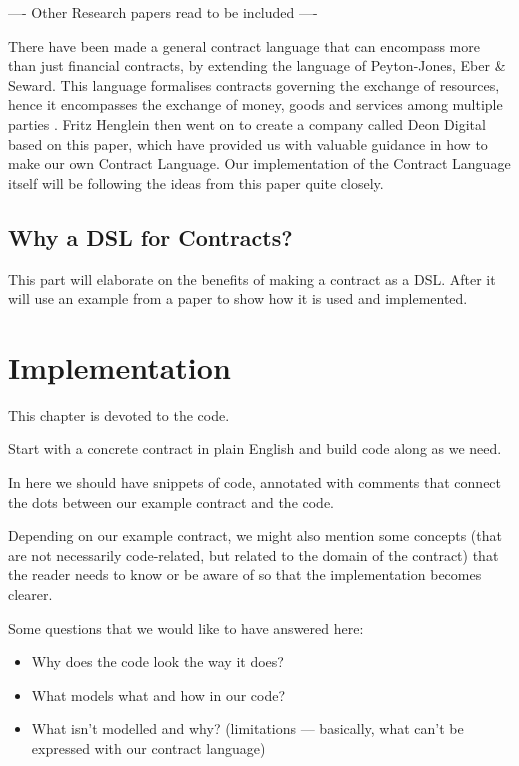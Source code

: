 \documentclass{ituthesis}
\begin{document}
---- Other Research papers read to be included ----

There have been made a general contract language that can encompass more than just financial contracts, by extending the language of Peyton-Jones, Eber \& Seward. This language formalises contracts governing the exchange of resources, hence it encompasses the exchange of money, goods and services among multiple parties \cite{andersen2006compositional}. Fritz Henglein then went on to create a company called Deon Digital based on this paper, which have provided us with valuable guidance in how to make our own Contract Language. Our implementation of the Contract Language itself will be following the ideas from this paper quite closely.

\section{Why a DSL for Contracts?}

This part will elaborate on the benefits of making a contract as a DSL. After it will use an example from a paper to show how it is used and implemented.


\chapter{Implementation}
This chapter is devoted to the code.\par
Start with a concrete contract in plain English and build code along as we need.\par
In here we should have snippets of code, annotated with comments that connect the dots between our example contract and the code.\par
Depending on our example contract, we might also mention some concepts (that are not necessarily code-related, but related to the domain of the contract) that the reader needs to know or be aware of so that the implementation becomes clearer.\par
Some questions that we would like to have answered here:
\begin{itemize}
    \item Why does the code look the way it does?
    \item What models what and how in our code?
    \item What isn't modelled and why? (limitations --- basically, what can't be expressed with our contract language)
\end{itemize}
\end{document}
